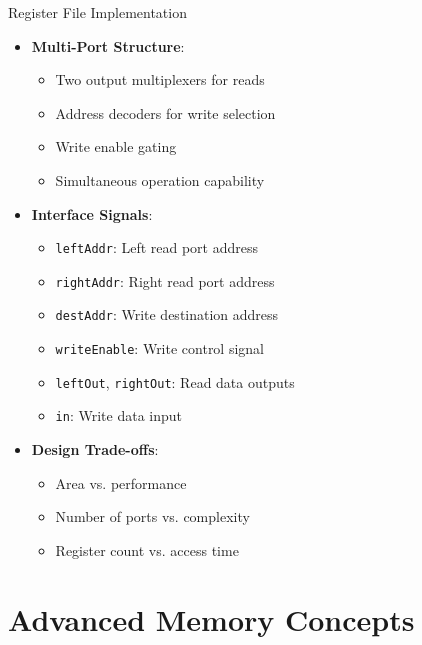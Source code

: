 \documentclass[aspectratio=169,11pt]{beamer}
\newcommand{\concept}[1]{\textbf{\color{accentcolor}#1}}
\begin{document}
\begin{frame}{Register File Implementation}
\begin{itemize}
\item \concept{Multi-Port Structure}:
\begin{itemize}
\item Two output multiplexers for reads
\item Address decoders for write selection
\item Write enable gating
\item Simultaneous operation capability
\end{itemize}
\vspace{0.5cm}
\item \concept{Interface Signals}:
\begin{itemize}
\item \texttt{leftAddr}: Left read port address
\item \texttt{rightAddr}: Right read port address
\item \texttt{destAddr}: Write destination address
\item \texttt{writeEnable}: Write control signal
\item \texttt{leftOut}, \texttt{rightOut}: Read data outputs
\item \texttt{in}: Write data input
\end{itemize}
\vspace{0.3cm}
\item \concept{Design Trade-offs}:
\begin{itemize}
\item Area vs. performance
\item Number of ports vs. complexity
\item Register count vs. access time
\end{itemize}
\end{itemize}
\end{frame}

\section{Advanced Memory Concepts}
\end{document}
